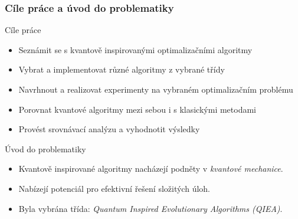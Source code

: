 \begin{frame}
  \frametitle{Cíle práce a úvod do problematiky}
  \small
  \begin{block}{Cíle práce}
    \begin{itemize}
      \item Seznámit se s kvantově inspirovanými optimalizačními algoritmy
      \item Vybrat a implementovat různé algoritmy z vybrané třídy
      \item Navrhnout a realizovat experimenty na vybraném optimalizačním problému
      \item Porovnat kvantové algoritmy mezi sebou i s klasickými metodami
      \item Provést srovnávací analýzu a vyhodnotit výsledky
    \end{itemize}
  \end{block}

  \begin{block}{Úvod do problematiky}
    \begin{itemize}
      \item Kvantově inspirované algoritmy nacházejí podněty v \emph{kvantové mechanice}.
      \item Nabízejí potenciál pro efektivní řešení složitých úloh.
      \item Byla vybrána třída: \textit{Quantum Inspired Evolutionary Algorithms (QIEA)}.
    \end{itemize}
  \end{block}
\end{frame}



